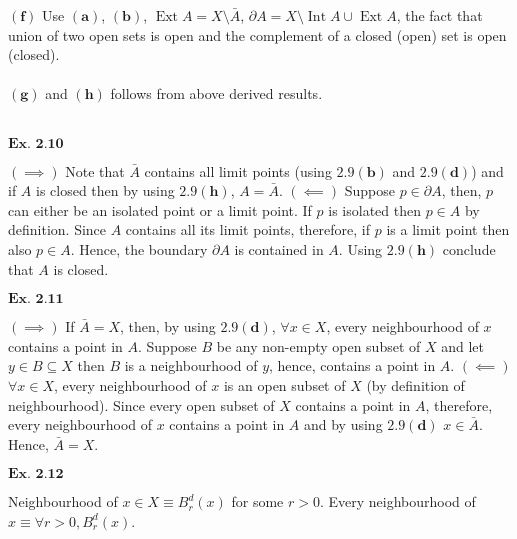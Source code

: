 \documentclass{article}
\begin{document}
$\mathbf{(f)}$ Use $\mathbf{(a)}$, $\mathbf{(b)}$, $\operatorname{Ext}A = X \setminus \bar{A}$, $\partial A = X \setminus \operatorname{Int}A \cup \operatorname{Ext}A$, the fact that union of two open sets is open and the complement of a closed (open) set is open (closed).\\~\\

$\mathbf{(g)}$ and $\mathbf{(h)}$ follows from above derived results.\\~\\

\vspace{0.2in}

${\textbf{Ex. 2.10}}$

$(\implies)$ Note that $\bar{A}$ contains all limit points (using $\mathbf{2.9(b)}$ and $\mathbf{2.9(d)}$) and if $A$ is closed then by using $\mathbf{2.9(h)}$, $A = \bar{A}$. $(\impliedby)$ Suppose $p \in \partial A$, then, $p$ can either be an isolated point or a limit point. If $p$ is isolated then $p \in A$ by definition. Since $A$ contains all its limit points, therefore, if $p$ is a limit point then also $p \in A$. Hence, the boundary $\partial A$ is contained in $A$. Using $\mathbf{2.9(h)}$ conclude that $A$ is closed.

\vspace{0.2in}

${\textbf{Ex. 2.11}}$

$(\implies)$ If $\bar{A} = X$, then, by using $\mathbf{2.9(d)}$, $\forall x \in X$, every neighbourhood of $x$ contains a point in $A$. Suppose $B$ be any non-empty open subset of $X$ and let $y \in B \subseteq X$ then $B$ is a neighbourhood of $y$, hence, contains a point in $A$. $(\impliedby)$ $\forall x \in X$, every neighbourhood of $x$ is an open subset of $X$ (by definition of neighbourhood). Since every open subset of $X$ contains a point in $A$, therefore, every neighbourhood of $x$ contains a point in $A$ and by using $\mathbf{2.9(d)}$ $x \in \bar{A}$. Hence, $\bar{A} = X$.

\vspace{0.2in}

${\textbf{Ex. 2.12}}$

Neighbourhood of $x \in X \equiv B_{r}^{d}(x)$ for some $r > 0$. Every neighbourhood of $x \equiv \forall r > 0, B_{r}^{d}(x)$.

\vspace{0.2in}
\end{document}
